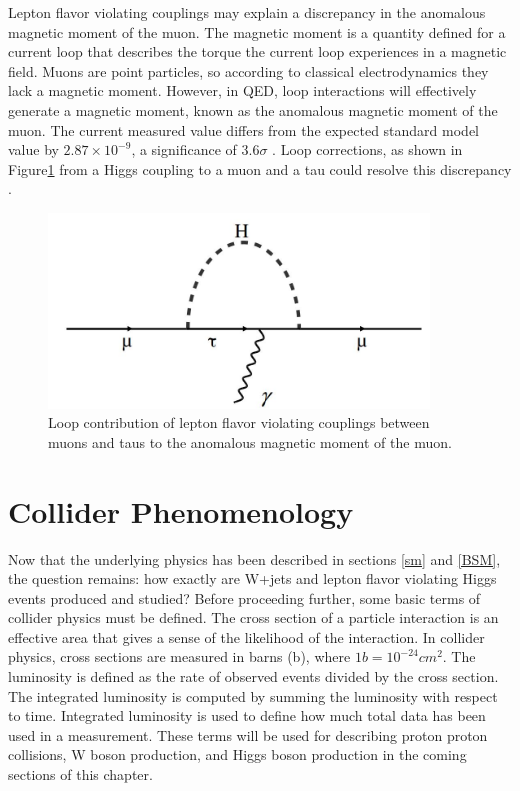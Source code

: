 \documentclass[oneside, letterpaper, oldfontcommands]{memoir}
\begin{document}
\qquad Lepton flavor violating couplings may explain a discrepancy in the anomalous magnetic moment of the muon. The magnetic moment is a quantity defined for a current loop that describes the torque the current loop experiences in a magnetic field. Muons are point particles, so according to classical electrodynamics they lack a magnetic moment. However, in QED, loop interactions will effectively generate a magnetic moment, known as the anomalous magnetic moment of the muon. The current measured value differs from the expected standard model value by $2.87 \times 10^{-9}$, a significance of $3.6 \sigma$ \cite{Bennett:2004pv}\cite{Agashe:2014kda}. Loop corrections, as shown in Figure\ref{fig:mutauloop} from a Higgs coupling to a muon and a tau could resolve this discrepancy \cite{Harnik:2012pb}. 

\begin{figure}[here]
\includegraphics[width=0.9\textwidth]{mutauloop.jpg}
\caption{Loop contribution of lepton flavor violating couplings between muons and taus to the anomalous magnetic moment of the muon.}
\label{fig:mutauloop}
\end{figure}

\chapter{Collider Phenomenology}\label{pheno}
\qquad Now that the underlying physics has been described in sections \ref{sm} and \ref{BSM}, the question remains: how exactly are W+jets and lepton flavor violating Higgs events produced and studied? Before proceeding further, some basic terms of collider physics must be defined. The cross section of a particle interaction is an effective area that gives a sense of the likelihood of the interaction. In collider physics, cross sections are measured in barns (b), where $1b = 10^{-24}cm^{2}$. The luminosity is defined as the rate of observed events divided by the cross section. The integrated luminosity is computed by summing the luminosity with respect to time. Integrated luminosity is used to define how much total data has been used in a measurement. These terms will be used for describing proton proton collisions, W boson production, and Higgs boson production in the coming sections of this chapter.
\end{document}
